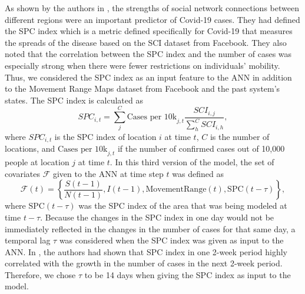 As shown by the authors in \cite{kuchlerGeographicSpreadCOVID192020}, the strengths of social network connections between different regions were an important predictor of Covid-19 cases.
They had defined the \gls{SPC} index which is a metric defined specifically for Covid-19 that measures the spreads of the disease based on the \gls{SCI} dataset from Facebook.
They also noted that the correlation between the \gls{SPC} index and the number of cases was especially strong when there were fewer restrictions on individuals' mobility.
Thus, we considered the \gls{SPC} index as an input feature to the \gls{ANN} in addition to the Movement Range Maps dataset from Facebook and the past system's states.
The \gls{SPC} index is calculated as
\begin{equation*}
    SPC_{i,t} = \sum_j^C \text{Cases per 10k}_{j,t} \frac{SCI_{i,j}}{\sum_h^C SCI_{i,h}},
\end{equation*}
where $SPC_{i,t}$ is the \gls{SPC} index of location $i$ at time $t$, $C$ is the number of locations, and $\text{Cases per 10k}_{j,t}$ if the number of confirmed cases out of 10,000 people at location $j$ at time $t$.
In this third version of the model, the set of covariates $\mathcal{F}$ given to the \gls{ANN} at time step $t$ was defined as
\begin{equation*}
    \mathcal{F}(t) = \left\lbrace \frac{S(t-1)}{N(t-1)}, I(t-1), \text{MovementRange}(t), \text{SPC}(t - \tau) \right\rbrace,
\end{equation*}
where $\text{SPC}(t - \tau)$ was the \gls{SPC} index of the area that was being modeled at time $t - \tau$.
Because the changes in the \gls{SPC} index in one day would not be immediately reflected in the changes in the number of cases for that same day, a temporal lag $\tau$ was considered when the \gls{SPC} index was given as input to the \gls{ANN}.
In \cite{kuchlerGeographicSpreadCOVID192020}, the authors had shown that \gls{SPC} index in one 2-week period highly correlated with the growth in the number of cases in the next 2-week period.
Therefore, we chose $\tau$ to be 14 days when giving the \gls{SPC} index as input to the model.